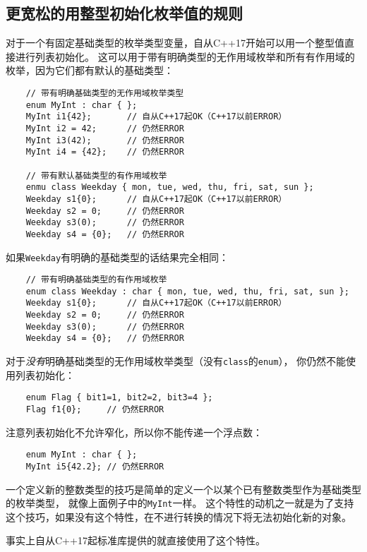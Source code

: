 \subsection{更宽松的用整型初始化枚举值的规则}\label{ch8.3}
对于一个有固定基础类型的枚举类型变量，自从C++17开始可以用一个整型值直接进行列表初始化。
这可以用于带有明确类型的无作用域枚举和所有有作用域的枚举，因为它们都有默认的基础类型：
\begin{lstlisting}
    // 带有明确基础类型的无作用域枚举类型
    enum MyInt : char { };
    MyInt i1{42};       // 自从C++17起OK（C++17以前ERROR）
    MyInt i2 = 42;      // 仍然ERROR
    MyInt i3(42);       // 仍然ERROR
    MyInt i4 = {42};    // 仍然ERROR

    // 带有默认基础类型的有作用域枚举
    enmu class Weekday { mon, tue, wed, thu, fri, sat, sun };
    Weekday s1{0};      // 自从C++17起OK（C++17以前ERROR）
    Weekday s2 = 0;     // 仍然ERROR
    Weekday s3(0);      // 仍然ERROR
    Weekday s4 = {0};   // 仍然ERROR
\end{lstlisting}
如果\texttt{Weekday}有明确的基础类型的话结果完全相同：
\begin{lstlisting}
    // 带有明确基础类型的有作用域枚举
    enum class Weekday : char { mon, tue, wed, thu, fri, sat, sun };
    Weekday s1{0};      // 自从C++17起OK（C++17以前ERROR）
    Weekday s2 = 0;     // 仍然ERROR
    Weekday s3(0);      // 仍然ERROR
    Weekday s4 = {0};   // 仍然ERROR
\end{lstlisting}
对于\emph{没有}明确基础类型的无作用域枚举类型（没有\texttt{class}的\texttt{enum}），
你仍然不能使用列表初始化：
\begin{lstlisting}
    enum Flag { bit1=1, bit2=2, bit3=4 };
    Flag f1{0};     // 仍然ERROR
\end{lstlisting}
注意列表初始化不允许窄化，所以你不能传递一个浮点数：
\begin{lstlisting}
    enum MyInt : char { };
    MyInt i5{42.2}; // 仍然ERROR
\end{lstlisting}
一个定义新的整数类型的技巧是简单的定义一个以某个已有整数类型作为基础类型的枚举类型，
就像上面例子中的\texttt{MyInt}一样。
这个特性的动机之一就是为了支持这个技巧，如果没有这个特性，在不进行转换的情况下将无法初始化新的对象。

事实上自从C++17起标准库提供的就直接使用了这个特性。

